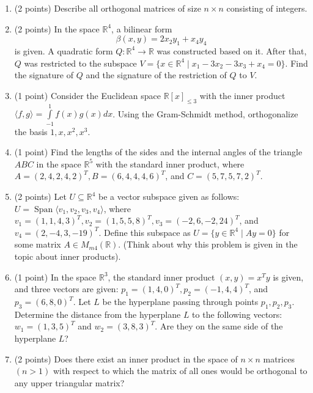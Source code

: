 \documentclass{article}
\begin{document}
\begin{enumerate}
  \item (2 points) Describe all orthogonal matrices of size 
  $n \times n$ consisting of integers.
  
  \item (2 points) In the space $\mathbb{R}^4$, a bilinear form 
  $$\beta(x, y) = 2x_2y_1 + x_4y_4$$ is given. 
  A quadratic form $Q: \mathbb{R}^4 \to \mathbb{R}$ was constructed 
  based on it. After that, $Q$ was restricted to the subspace 
  $V = \{x \in \mathbb{R}^4 \mid x_1 - 3x_2 - 3x_3 + x_4 = 0\}$. 
  Find the signature of $Q$ and the signature of the restriction of $Q$ to $V$.

  \item (1 point) Consider the Euclidean space $\mathbb{R}[x]_{\leq 3}$ with 
  the inner product $\langle f, g\rangle = \int\limits^1_{-1} f(x)g(x) dx$.
  Using the Gram-Schmidt method, orthogonalize the basis $1, x, x^2, x^3$.
  
  \item (1 point) Find the lengths of the sides and the internal angles of the 
  triangle $ABC$ in the space $\mathbb{R}^5$ with the standard inner product, 
  where $A = (2, 4, 2, 4, 2)^T, B = (6, 4, 4, 4, 6)^T$, and $C = (5, 7, 5, 7, 2)^T$.
  
  \item (2 points) Let $U \subseteq \mathbb{R}^4$ be a vector subspace given as follows: 
  $U = \operatorname{Span}\langle v_1, v_2, v_3, v_4\rangle$, where $v_1 = (1, 1, 4, 3)^T, v_2 = (1, 5, 5, 8)^T, v_3 = (-2, 6, -2, 24)^T$, 
  and $v_4 = (2, -4, 3, -19)^T$. Define this 
  subspace as $U = \{y \in \mathbb{R}^4 \mid Ay = 0\}$ for some 
  matrix $A \in M_{m4}(\mathbb{R})$. 
  (Think about why this problem is given in the topic about inner products).
  
  \item (1 point) In the space $\mathbb{R}^3$, the standard inner 
  product $(x, y) = x^Ty$ is given, and three vectors are given: 
  $p_1 = (1, 4, 0)^T, p_2 = (-1, 4, 4)^T$, and $p_3 = (6, 8, 0)^T$. 
  Let $L$ be the hyperplane passing through points $p_1, p_2, p_3$. 
  Determine the distance from the hyperplane $L$ to the following 
  vectors: $w_1 = (1, 3, 5)^T$ and $w_2 = (3, 8, 3)^T$. 
  Are they on the same side of the hyperplane $L$?
  
  \item (2 points) Does there exist an inner product in the space 
  of $n \times n$ matrices $(n > 1)$ with respect to which 
  the matrix of all ones would be orthogonal to any upper triangular matrix?
\end{enumerate}
\end{document}
